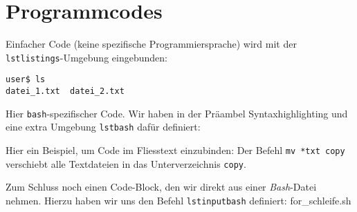 \documentclass[12pt, ngerman]{scrartcl}
\newcommand{\lstinputbash}{}
\begin{document}
%
\section{Programmcodes}
Einfacher Code (keine spezifische Programmiersprache) wird mit der
\texttt{lstlistings}-Umgebung eingebunden:
%
\begin{lstlisting}
user$ ls
datei_1.txt  datei_2.txt
\end{lstlisting}
%
Hier \texttt{bash}-spezifischer Code. Wir haben in der Präambel
Syntaxhighlighting und eine extra Umgebung \texttt{lstbash} dafür definiert:
%
%
Hier ein Beispiel, um Code im Fliesstext einzubinden: Der Befehl
\lstinline{mv *txt copy} verschiebt alle Textdateien in das
Unterverzeichnis \lstinline{copy}.

Zum Schluss noch einen Code-Block, den wir direkt aus einer \textit{Bash}-Datei
nehmen. Hierzu haben wir uns den Befehl \texttt{lstinputbash} definiert:
%
\lstinputbash{for_schleife.sh}
\end{document}

